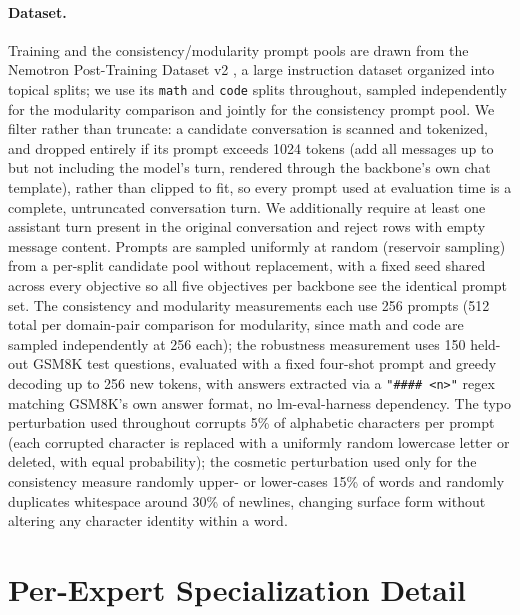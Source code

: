 \documentclass{article}
\begin{document}
\paragraph{Dataset.} Training and the consistency/modularity prompt pools are drawn from
the Nemotron Post-Training Dataset v2 \citep{nvidia2025nemotron}, a large instruction
dataset organized into topical splits; we use its \texttt{math} and \texttt{code} splits
throughout, sampled independently for the modularity comparison and jointly for the
consistency prompt pool. We filter rather than truncate: a candidate conversation is
scanned and tokenized, and dropped entirely if its prompt exceeds 1024 tokens (add all
messages up to but not including the model's turn, rendered through the backbone's own
chat template), rather than clipped to fit, so every prompt used at evaluation time is a
complete, untruncated conversation turn. We additionally require at least one assistant
turn present in the original conversation and reject rows with empty message content.
Prompts are sampled uniformly at random (reservoir sampling) from a per-split candidate
pool without replacement, with a fixed seed shared across every objective so all five
objectives per backbone see the identical prompt set. The consistency and modularity
measurements each use 256 prompts (512 total per domain-pair comparison for modularity,
since math and code are sampled independently at 256 each); the robustness measurement
uses 150 held-out GSM8K test questions, evaluated with a fixed four-shot prompt and
greedy decoding up to 256 new tokens, with answers extracted via a
\texttt{"\#\#\#\# <n>"} regex matching GSM8K's own answer format, no lm-eval-harness
dependency. The typo perturbation used throughout corrupts 5\% of alphabetic characters
per prompt (each corrupted character is replaced with a uniformly random lowercase letter
or deleted, with equal probability); the cosmetic perturbation used only for the
consistency measure randomly upper- or lower-cases 15\% of words and randomly duplicates
whitespace around 30\% of newlines, changing surface form without altering any character
identity within a word.

\section{Per-Expert Specialization Detail}
\label{app:spec}
\end{document}
